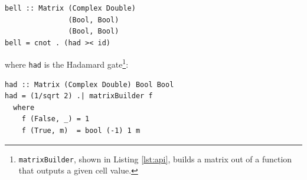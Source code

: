 \documentclass[sigplan]{acmart}\settopmatter{}
\newcommand{\hs}{\texttt}
\begin{document}
\begin{verbatim}
bell :: Matrix (Complex Double) 
               (Bool, Bool) 
               (Bool, Bool)
bell = cnot . (had >< id)
\end{verbatim}
where \hs{had} is the Hadamard gate\footnote{\hs{matrixBuilder}, shown in Listing \ref{lst:api}, builds a matrix out of a function that outputs a given cell value.}:
\begin{verbatim}
had :: Matrix (Complex Double) Bool Bool
had = (1/sqrt 2) .| matrixBuilder f
  where
    f (False, _) = 1
    f (True, m)  = bool (-1) 1 m
\end{verbatim}
%
%
%
\end{document}
